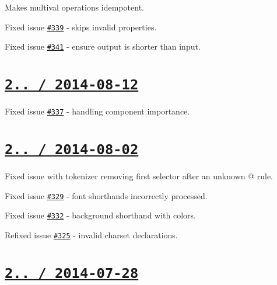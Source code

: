 \begin{DoxyItemize}
\item Makes multival operations idempotent.
\item Fixed issue \href{https://github.com/jakubpawlowicz/clean-css/issues/339}{\tt \#339} -\/ skips invalid properties.
\item Fixed issue \href{https://github.com/jakubpawlowicz/clean-css/issues/341}{\tt \#341} -\/ ensure output is shorter than input.
\end{DoxyItemize}

\section*{\href{https://github.com/jakubpawlowicz/clean-css/compare/v2.2.12...v2.2.13}{\tt 2.. / 2014-\/08-\/12} }


\begin{DoxyItemize}
\item Fixed issue \href{https://github.com/jakubpawlowicz/clean-css/issues/337}{\tt \#337} -\/ handling component importance.
\end{DoxyItemize}

\section*{\href{https://github.com/jakubpawlowicz/clean-css/compare/v2.2.11...v2.2.12}{\tt 2.. / 2014-\/08-\/02} }


\begin{DoxyItemize}
\item Fixed issue with tokenizer removing first selector after an unknown @ rule.
\item Fixed issue \href{https://github.com/jakubpawlowicz/clean-css/issues/329}{\tt \#329} -\/ {\ttfamily font} shorthands incorrectly processed.
\item Fixed issue \href{https://github.com/jakubpawlowicz/clean-css/issues/332}{\tt \#332} -\/ {\ttfamily background} shorthand with colors.
\item Refixed issue \href{https://github.com/jakubpawlowicz/clean-css/issues/325}{\tt \#325} -\/ invalid charset declarations.
\end{DoxyItemize}

\section*{\href{https://github.com/jakubpawlowicz/clean-css/compare/v2.2.10...v2.2.11}{\tt 2.. / 2014-\/07-\/28} }


